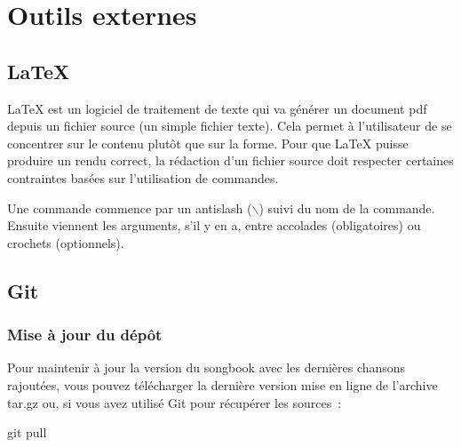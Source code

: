 \chapter{Outils externes}
\setcounter{chapter}{3}
\label{chap:outils-externes}
\minitoc

\section{\LaTeX{}}

\LaTeX{} est un logiciel de traitement de texte qui va générer un
document pdf depuis un fichier source (un simple fichier texte). Cela
permet à l'utilisateur de se concentrer sur le contenu plutôt que sur
la forme. Pour que \LaTeX{} puisse produire un rendu correct, la
rédaction d'un fichier source doit respecter certaines contraintes
basées sur l'utilisation de commandes.

Une commande commence par un antislash ($\backslash$) suivi du nom de
la commande. Ensuite viennent les arguments, s'il y en a, entre
accolades (obligatoires) ou crochets (optionnels).


\section{Git}

\subsection{Mise à jour du dépôt}

Pour maintenir à jour la version du songbook avec les dernières
chansons rajoutées, vous pouvez télécharger la dernière version mise
en ligne de l'archive tar.gz ou, si vous avez utilisé Git pour
récupérer les sources~:
\begin{unix}
  git pull
\end{unix} 

